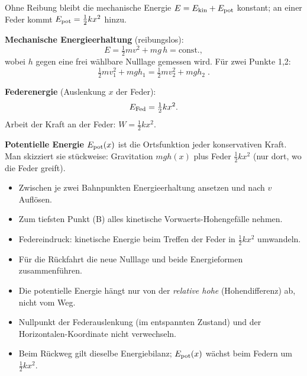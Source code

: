 

Ohne Reibung bleibt die mechanische Energie $E=E_{\rm kin}+E_{\rm pot}$
konstant; an einer Feder kommt $E_{\rm pot}=\tfrac12 kx^2$ hinzu.

\begin{werkzeugkasten}[Werkzeuge]
\textbf{Mechanische Energieerhaltung} (reibungslos):
\begin{equation}
  E=\tfrac12 m v^2+mg\,h=\text{const.},
\end{equation}
wobei $h$ gegen eine frei wählbare Nulllage gemessen wird. Für zwei
Punkte 1,2:
\begin{equation}
  \tfrac12 m v_1^2+mgh_1=\tfrac12 m v_2^2+mgh_2\;.
\end{equation}

\textbf{Federenergie} (Auslenkung $x$ der Feder):
\begin{equation}
  E_{\rm Fed}=\tfrac12 k x^2.
\end{equation}
Arbeit der Kraft an der Feder: $W=\tfrac12kx^2$.

\textbf{Potentielle Energie $E_{\rm pot}(x)$} ist die Ortsfunktion jeder
konservativen Kraft. Man skizziert sie stückweise: Gravitation
$mgh(x)$ plus Feder $\tfrac12kx^2$ (nur dort, wo die Feder greift).
\end{werkzeugkasten}

\begin{werkzeugkasten}[Vorgehen]
\begin{itemize}
  \item Zwischen je zwei Bahnpunkten Energieerhaltung ansetzen und nach
        $v$ Auflösen.
  \item Zum tiefsten Punkt (B) alles kinetische Vorwaerts-Hohengefälle
        nehmen.
  \item Federeindruck: kinetische Energie beim Treffen der Feder in
        $\tfrac12kx^2$ umwandeln.
  \item Für die Rückfahrt die neue Nulllage und beide Energieformen
        zusammenführen.
\end{itemize}
\end{werkzeugkasten}

\begin{achtung}
\begin{itemize}
  \item Die potentielle Energie hängt nur von der \emph{relative hohe}
        (Hohendifferenz) ab, nicht vom Weg.
  \item Nullpunkt der Federauslenkung (im entspannten Zustand) und der
        Horizontalen-Koordinate nicht verwechseln.
  \item Beim Rückweg gilt dieselbe Energiebilanz; $E_{\rm pot}(x)$ wächst
        beim Federn um $\tfrac12kx^2$.
\end{itemize}
\end{achtung}
